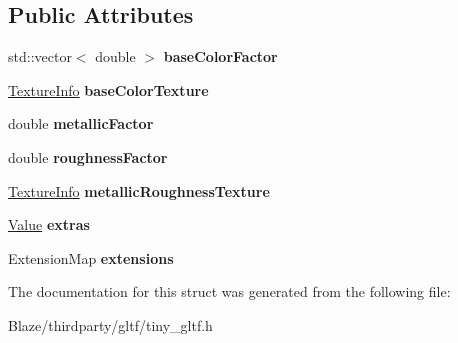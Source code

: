 \subsection*{Public Attributes}
\begin{DoxyCompactItemize}
\item 
\mbox{\label{structtinygltf_1_1PbrMetallicRoughness_a14ceb24511208dc2ab820bac42759c49}} 
std\+::vector$<$ double $>$ {\bfseries base\+Color\+Factor}
\item 
\mbox{\label{structtinygltf_1_1PbrMetallicRoughness_a619dbe68560411b26846a571218c7eed}} 
\hyperlink{structtinygltf_1_1TextureInfo}{Texture\+Info} {\bfseries base\+Color\+Texture}
\item 
\mbox{\label{structtinygltf_1_1PbrMetallicRoughness_af969d6ee1de4476ee87f6e75fadd1887}} 
double {\bfseries metallic\+Factor}
\item 
\mbox{\label{structtinygltf_1_1PbrMetallicRoughness_a2fd8e186d78404a436b399d48dea42f8}} 
double {\bfseries roughness\+Factor}
\item 
\mbox{\label{structtinygltf_1_1PbrMetallicRoughness_ad5b1a869cf7e4cd180548d6e7440be3a}} 
\hyperlink{structtinygltf_1_1TextureInfo}{Texture\+Info} {\bfseries metallic\+Roughness\+Texture}
\item 
\mbox{\label{structtinygltf_1_1PbrMetallicRoughness_ad2df420bca8da46f8b6b95a77978aa5b}} 
\hyperlink{classtinygltf_1_1Value}{Value} {\bfseries extras}
\item 
\mbox{\label{structtinygltf_1_1PbrMetallicRoughness_ae9a211dc0a6f053ecc21022894b5c386}} 
Extension\+Map {\bfseries extensions}
\end{DoxyCompactItemize}


The documentation for this struct was generated from the following file\+:\begin{DoxyCompactItemize}
\item 
Blaze/thirdparty/gltf/tiny\+\_\+gltf.\+h\end{DoxyCompactItemize}
